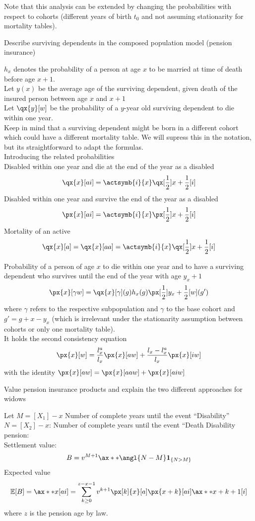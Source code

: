 \documentclass[11pt,a4paper,twoside]{article}
\begin{document}
Note that this analysis can be extended by changing the probabilities with respect to cohorts (different years of birth \( t_0 \)
and not assuming stationarity for mortality tables).


Describe surviving dependents in the composed population model (pension insurance)


\(h_x\) denotes the probability of a person at age \( x \) to be married at
time of death before age \( x + 1 \). \\
Let \( y(x) \) be the average age of the surviving dependent, given death of the insured
person between age \( x \) and \( x+1 \) \\
Let \( \qx{y}[w] \) be the probability of a \( y \)-year old surviving dependent to die
within one year. \\
Keep in mind that a surviving dependent might be born in a different cohort which could have a different mortality table.
We will supress this in the notation, but its straightforward to adapt the formulas.\\

Introducing the related probabilities \\
Disabled within one year and die at the end of the year as a disabled
\[ \qx{x}[ai] = \actsymb{i}{x} \qx[\frac{1}{2}]{x + \frac{1}{2}}[i] \]
Disabled within one year and survive the end of the year as a disabled
\[ \px{x}[ai] = \actsymb{i}{x} \px[\frac{1}{2}]{x + \frac{1}{2}}[i] \]
Mortality of an active
\[ \qx{x}[a] = \qx{x}[aa] = \actsymb{i}{x} \qx[\frac{1}{2}]{x + \frac{1}{2}}[i]\]

Probability of a person of age \( x \) to die within one year and to have a surviving
dependent who survives until the end of the year with age \( y_x + 1 \)
\[ \px{x}[\gamma w] = \qx{x}[\gamma](g)h_x(g) \px[\frac{1}{2}]{y_x + \frac{1}{2}}[w](g') \]
where \( \gamma \) refers to the respective subpopulation and \( \gamma \) to the base cohort and \( g' = g + x - y_x \) 
(which is irrelevant under the stationarity assumption between cohorts or only one mortality table). \\

It holds the second consistency equation 
\[ \px{x}[w] = \frac{l^a_x}{l_x}\px{x}[aw] + \frac{l_x - l_x^a}{l_x}\px{x}[iw] \]
with the identity \( \px{x}[aw] = \px{x}[aaw] + \px{x}[aiw] \)


Value pension insurance products and explain the two different approaches for widows

Let
\( M = [X_1] - x \) Number of complete years until the event “Disability”
\(N = [X_2] - x\): Number of complete years until the event “Death
Disability pension:\\
Settlement value:
\[ B = v^{M+1} \ax**{\angl{N - M}} \mathbf{1}_{\{N > M\}} \]
Expected value
\[ \mathbb{E}[B] = \ax**{x}[ai] = \sum_{k \geq 0}^{z - x - 1} v^{k+1} \px[k]{x}[a] \px{x+k}[ai] \ax**{x + k + 1}[i] \]
where \( z \) is the pension age by law.
\end{document}
